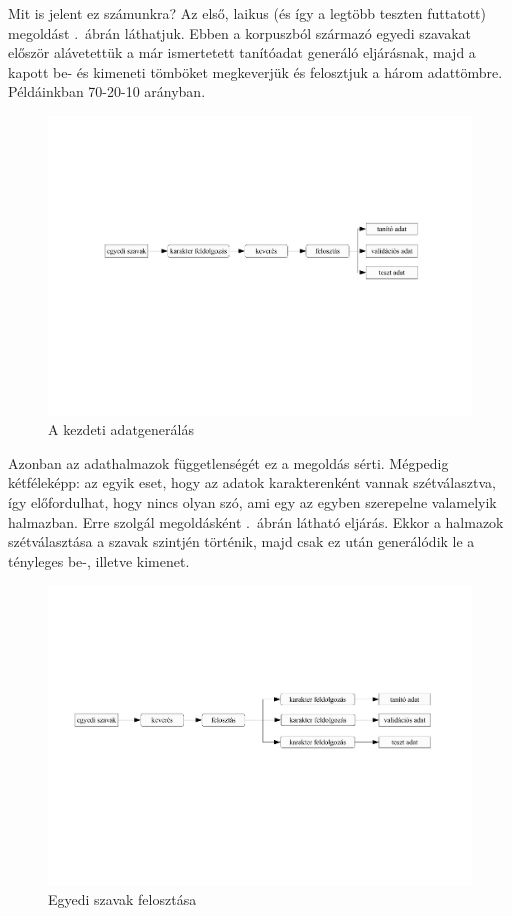 \documentclass[a4paper, magyar]{article}
\newcommand{\figref}[1]{\aref{#1}.~ábr}
\begin{document}
Mit is jelent ez számunkra? Az első, laikus (és így a legtöbb teszten futtatott) megoldást \figref{fig:dfdef}án láthatjuk. Ebben a korpuszból származó egyedi szavakat először alávetettük a már ismertetett tanítóadat generáló eljárásnak, majd a kapott be- és kimeneti tömböket megkeverjük és felosztjuk a három adattömbre. Példáinkban 70-20-10 arányban.
\begin{figure}[htp]
	\includegraphics[trim={0 9cm 0 7cm},clip,
	width=\textwidth]{figures/dataflowdefault.pdf}
	\caption{A kezdeti adatgenerálás}\par\medskip\centering
	\label{fig:dfdef}
\end{figure}

Azonban az adathalmazok függetlenségét ez a megoldás sérti. Mégpedig kétféleképp: az egyik eset, hogy az adatok karakterenként vannak szétválasztva, így előfordulhat, hogy nincs olyan szó, ami egy az egyben szerepelne valamelyik halmazban. Erre szolgál megoldásként \figref{fig:dfuwords}án látható eljárás. Ekkor a halmazok szétválasztása a szavak szintjén történik, majd csak ez után generálódik le a tényleges be-, illetve kimenet.
\begin{figure}[htp]
	\includegraphics[trim={0 8cm 0 7cm},clip,
	width=\textwidth]{figures/dataflowuwords.pdf}
	\caption{Egyedi szavak felosztása}\par\medskip\centering
	\label{fig:dfuwords}
\end{figure}
\end{document}
